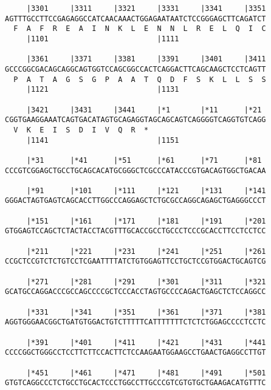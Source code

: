 \documentclass{article}
\begin{document}
\begin{Verbatim}
     |3301     |3311     |3321     |3331     |3341     |3351
AGTTTGCCTTCCGAGAGGCCATCAACAAACTGGAGAATAATCTCCGGGAGCTTCAGATCT
  F  A  F  R  E  A  I  N  K  L  E  N  N  L  R  E  L  Q  I  C
     |1101                         |1111                    
  
     |3361     |3371     |3381     |3391     |3401     |3411
GCCCGGCGACAGCAGGCAGTGGTCCAGCGGCCACTCAGGACTTCAGCAAGCTCCTCAGTT
  P  A  T  A  G  S  G  P  A  A  T  Q  D  F  S  K  L  L  S  S
     |1121                         |1131                    
  
     |3421     |3431     |3441     |*1       |*11      |*21 
CGGTGAAGGAAATCAGTGACATAGTGCAGAGGTAGCAGCAGTCAGGGGTCAGGTGTCAGG
  V  K  E  I  S  D  I  V  Q  R  *   
     |1141                         |1151                    
  
     |*31      |*41      |*51      |*61      |*71      |*81 
CCCGTCGGAGCTGCCTGCAGCACATGCGGGCTCGCCCATACCCGTGACAGTGGCTGACAA
                                                            
     |*91      |*101     |*111     |*121     |*131     |*141
GGGACTAGTGAGTCAGCACCTTGGCCCAGGAGCTCTGCGCCAGGCAGAGCTGAGGGCCCT
                                                            
     |*151     |*161     |*171     |*181     |*191     |*201
GTGGAGTCCAGCTCTACTACCTACGTTTGCACCGCCTGCCCTCCCGCACCTTCCTCCTCC
                                                            
     |*211     |*221     |*231     |*241     |*251     |*261
CCGCTCCGTCTCTGTCCTCGAATTTTATCTGTGGAGTTCCTGCTCCGTGGACTGCAGTCG
                                                            
     |*271     |*281     |*291     |*301     |*311     |*321
GCATGCCAGGACCCGCCAGCCCCGCTCCCACCTAGTGCCCCAGACTGAGCTCTCCAGGCC
                                                            
     |*331     |*341     |*351     |*361     |*371     |*381
AGGTGGGAACGGCTGATGTGGACTGTCTTTTTCATTTTTTTCTCTCTGGAGCCCCTCCTC
                                                            
     |*391     |*401     |*411     |*421     |*431     |*441
CCCCGGCTGGGCCTCCTTCTTCCACTTCTCCAAGAATGGAAGCCTGAACTGAGGCCTTGT
                                                            
     |*451     |*461     |*471     |*481     |*491     |*501
GTGTCAGGCCCTCTGCCTGCACTCCCTGGCCTTGCCCGTCGTGTGCTGAAGACATGTTTC
                                                            

\end{Verbatim}
\end{document}
